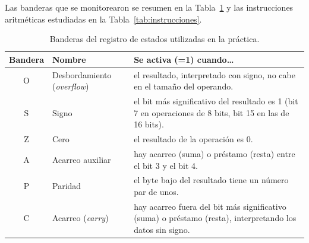 \documentclass[10pt]{article}
\begin{document}
Las banderas que se monitorearon se resumen en la Tabla~\ref{tab:banderas} y las instrucciones aritméticas estudiadas en la Tabla~\ref{tab:instrucciones}.
 
\begin{table}[htbp]
  \centering
  \caption{Banderas del registro de estados utilizadas en la práctica.}
  \label{tab:banderas}
  \begin{tabular}{|c|p{3cm}|p{6.5cm}|}
    \hline
    \textbf{Bandera} & \textbf{Nombre} & \textbf{Se activa (=1) cuando\ldots} \\
    \hline
    O & Desbordamiento (\textit{overflow}) & el resultado, interpretado con signo, no cabe en el tamaño del operando. \\
    \hline
    S & Signo & el bit más significativo del resultado es 1 (bit 7 en operaciones de 8 bits, bit 15 en las de 16 bits). \\
    \hline
    Z & Cero & el resultado de la operación es 0. \\
    \hline
    A & Acarreo auxiliar & hay acarreo (suma) o préstamo (resta) entre el bit 3 y el bit 4. \\
    \hline
    P & Paridad & el byte bajo del resultado tiene un número par de unos. \\
    \hline
    C & Acarreo (\textit{carry}) & hay acarreo fuera del bit más significativo (suma) o préstamo (resta), interpretando los datos sin signo. \\
    \hline
  \end{tabular}
\end{table}
 
\end{document}
